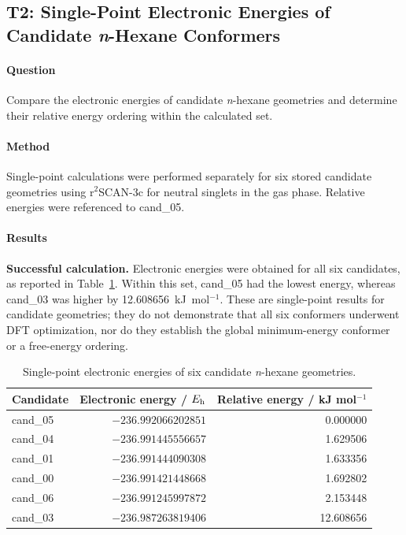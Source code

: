\subsection{T2: Single-Point Electronic Energies of Candidate \textit{n}-Hexane Conformers}
\paragraph{Question}
Compare the electronic energies of candidate \textit{n}-hexane geometries and determine their relative energy ordering within the calculated set.

\paragraph{Method}
Single-point calculations were performed separately for six stored candidate geometries using r$^{2}$SCAN-3c for neutral singlets in the gas phase.
Relative energies were referenced to cand\_05.

\paragraph{Results}
\textbf{Successful calculation.} Electronic energies were obtained for all six candidates, as reported in Table~\ref{tab:t2-energies}.
Within this set, cand\_05 had the lowest energy, whereas cand\_03 was higher by 12.608656~kJ~mol$^{-1}$.
These are single-point results for candidate geometries; they do not demonstrate that all six conformers underwent DFT optimization,
nor do they establish the global minimum-energy conformer or a free-energy ordering.

\begin{table}[H]
  \centering\small
  \caption{Single-point electronic energies of six candidate \textit{n}-hexane geometries.}
  \label{tab:t2-energies}
  \begin{tabular}{lrr}
    \toprule
    Candidate & Electronic energy / $E_{\mathrm h}$ & Relative energy / kJ mol$^{-1}$\\
    \midrule
    cand\_05 & $-236.992066202851$ & 0.000000\\
    cand\_04 & $-236.991445556657$ & 1.629506\\
    cand\_01 & $-236.991444090308$ & 1.633356\\
    cand\_00 & $-236.991421448668$ & 1.692802\\
    cand\_06 & $-236.991245997872$ & 2.153448\\
    cand\_03 & $-236.987263819406$ & 12.608656\\
    \bottomrule
  \end{tabular}
\end{table}

